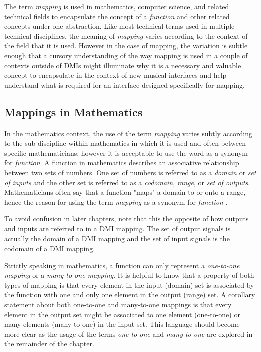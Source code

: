 The term \emph{mapping} is used in mathematics, computer science, and related technical fields to encapsulate the concept of a \emph{function} and other related concepts under one abstraction. Like most technical terms used in multiple technical disciplines, the meaning of \emph{mapping} varies according to the context of the field that it is used. However in the case of mapping, the variation is subtle enough that a cursory understanding of the way mapping is used in a couple of contexts outside of DMIs might illuminate why it is a necessary and valuable concept to encapsulate in the context of new musical interfaces and help understand what is required for an interface designed specifically for mapping.

\subsection{Mappings in Mathematics}
\label{sec:Mappings in Mathematics}

In the mathematics context, the use of the term \emph{mapping} varies subtly according to the sub-discipline within mathematics in which it is used and often between specific mathematicians; however it is acceptable to use the word as a synonym for \emph{function}. A function in mathematics describes an associative relationship between two sets of numbers. One set of numbers is referred to as a \emph{domain} or \emph{set of inputs} and the other set is referred to as a \emph{codomain}, \emph{range}, or \emph{set of outputs}. Mathematicians often say that a function "maps" a domain to or onto a range, hence the reason for using the term \emph{mapping} as a synonym for \emph{function} \cite{functionMapping}.

To avoid confusion in later chapters, note that this the opposite of how outputs and inputs are referred to in a DMI mapping. The set of output signals is actually the domain of a DMI mapping and the set of input signals is the codomain of a DMI mapping. 

Strictly speaking in mathematics, a function can only represent a \emph{one-to-one mapping} or a \emph{many-to-one mapping}. It is helpful to know that a property of both types of mapping is that every element in the input (domain) set is associated by the function with one and only one element in the output (range) set. A corollary statement about both one-to-one and many-to-one mappings is that every element in the output set might be associated to one element (one-to-one) or many elements (many-to-one) in the input set. This language should become more clear as the usage of the terms \emph{one-to-one} and \emph{many-to-one} are explored in the remainder of the chapter.

